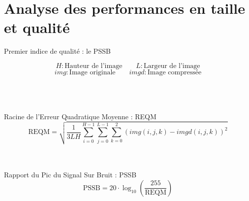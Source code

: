 \documentclass[xcolor=dvipsnames]{beamer}
\begin{document}
\section{Analyse des performances en taille et qualité}

\begin{frame}
	\sectionpage
\end{frame}

\begin{frame} {Premier indice de qualité : le PSSB}
    \centering
    \scriptsize
    
    \[H : \text{Hauteur de l'image} \ \ \ \ \ \ \ \ \ L : \text{Largeur de l'image}\]
    \[img : \text{Image originale} \ \ \ \ \ \ \ \ \ imgd : \text{Image compressée}\]

    \ \\ \ \\ \ \\
    
    Racine de l'Erreur Quadratique Moyenne : REQM
    \[
    \text{REQM} = \sqrt{\frac{1}{3LH} \sum_{i=0}^{H-1} \sum_{j=0}^{L-1} \sum_{k=0}^{2} \left(img(i, j, k) - imgd(i, j, k) \right)^2}
    \]

    \centering
    \scriptsize
    \ \\ \ \\  Rapport du Pic du Signal Sur Bruit : PSSB
    \[
    \text{PSSB} = 20 \cdot \log_{10} \left( \frac{255}{\text{REQM}} \right)
    \]

\end{frame}
\end{document}
